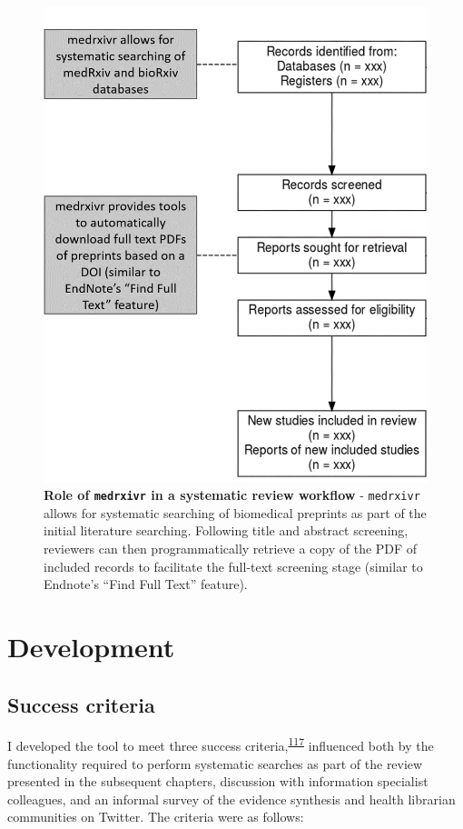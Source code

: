 \documentclass[a4paper, twoside]{templates/ociamthesis}
\begin{document}
\begin{figure}

{\centering \includegraphics[width=0.65\linewidth]{figures/sys-rev-tools/medrxiv-role} 

}

\caption[Role of \texttt{medrxivr} in a systematic review workflow]{\textbf{Role of \texttt{medrxivr} in a systematic review workflow} - \texttt{medrxivr} allows for systematic searching of biomedical preprints as part of the initial literature searching. Following title and abstract screening, reviewers can then programmatically retrieve a copy of the PDF of included records to facilitate the full-text screening stage (similar to Endnote's ``Find Full Text'' feature).}\label{fig:medrxivr-sr}
\end{figure}

\hypertarget{development}{%
\section{Development}\label{development}}

\hypertarget{success-criteria}{%
\subsection{Success criteria}\label{success-criteria}}

I developed the tool to meet three success criteria,\textsuperscript{\protect\hyperlink{ref-wateridge1995}{117}} influenced both by the functionality required to perform systematic searches as part of the review presented in the subsequent chapters, discussion with information specialist colleagues, and an informal survey of the evidence synthesis and health librarian communities on Twitter. The criteria were as follows:
\end{document}
